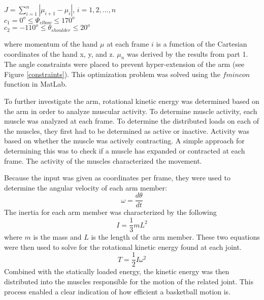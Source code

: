 \begin{multicols}{2}
\begin{minipage}[t]{.2\linewidth}
\end{minipage} 
\hfill
\begin{minipage}[t]{.7\linewidth}
\begin{flushleft}
$J = \sum_{i = 1}^n\left\vert \mu_{i+1} -\mu_i \right\vert$, $i = 1,2,...,n$\\
$c_1 = 0^o \leq \Psi_{elbow} \leq 170^o$\\
$c_2 = -110^o \leq \theta_{shoulder} \leq 20^o$ 

\end{flushleft}
\end{minipage}
\vspace{1em}
\noindent
where momentum of the hand $\mu$ at each frame $i$ is a function of the Cartesian coordinates of the hand x, y, and z. $\mu_n$ was derived by the results from part 1.  The angle constraints were placed to prevent hyper-extension of the arm (see Figure \ref{constraints}).  This optimization problem was solved using the $fmincon$ function in MatLab.  


To further investigate the arm, rotational kinetic energy was determined based on the arm in order to analyze muscular activity. To determine muscle activity, each muscle was analyzed at each frame.  To determine the distributed loads on each of the muscles, they first had to be determined as active or inactive.  Activity was based on whether the muscle was actively contracting.  A simple approach for determining this was to check if a muscle has expanded or contracted at each frame.  The activity of the muscles characterized the movement.  

Because the input was given as coordinates per frame, they were used to determine the angular velocity of each arm member:
\[\omega = \dfrac{d\theta}{dt}\]
The inertia for each arm member was characterized by the following
\[I = \dfrac{1}{3}mL^2\]
where $m$ is the mass and $L$ is the length of the arm member. These two equations were then used to solve for the rotational kinetic energy found at each joint.
\[T = \dfrac{1}{2}I\omega^2\]
Combined with the statically loaded energy, the kinetic energy was then distributed into the muscles responsible for the motion of the related joint. This process enabled a clear indication of how efficient a basketball motion is.  
\end{multicols}


\begin{multicols}{2}
\end{multicols}